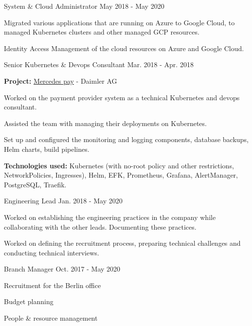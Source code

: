 \begin{cventries}
    \cventry
    {System \& Cloud Administrator}
    {}
    {}
    {May 2018 - May 2020}
    {
    \begin{cvitems}
        \item {
        Migrated various applications that are running on Azure to Google Cloud,
        to managed Kubernetes clusters and other managed GCP resources.
        }
        \item {Identity Access Management of the cloud resources on Azure and Google Cloud.}
    \end{cvitems}
    }

    \cventry
    {Senior Kubernetes \& Devops Consultant}
    {}
    {}
    {Mar. 2018 - Apr. 2018}
    {
    \begin{cvitems}
        \item {
        \textbf{Project:} \href{https://www.daimler-mobility.com/en/solutions/mobility-ecosystem/portfolio/payment-services/}{Mercedes pay} - Daimler AG
        }
        \newline
        \item {Worked on the payment provider system as a technical Kubernetes and devops consultant.}
        \item {Assisted the team with managing their deployments on Kubernetes.}
        \item {
        Set up and configured the monitoring and logging components, database backups,
        Helm charts, build pipelines.
        }
        \smallskip
        \item {
        \textbf{Technologies used:} Kubernetes (with no-root policy and other restrictions,
        NetworkPolicies, Ingresses), Helm, EFK, Prometheus,
        Grafana, AlertManager, PostgreSQL, Traefik.
        }
    \end{cvitems}
    }

    \cventry
    {Engineering Lead}
    {}
    {}
    {Jan. 2018 - May 2020}
    {
    \begin{cvitems}
        \item {
        Worked on establishing the engineering practices in the company while
        collaborating with the other leads. Documenting these practices.
        }
        \item {
        Worked on defining the recruitment process, preparing technical challenges
        and conducting technical interviews.
        }
    \end{cvitems}
    }

    \cventry
    {Branch Manager}
    {}
    {}
    {Oct. 2017 - May 2020}
    {
    \begin{cvitems}
        \item {Recruitment for the Berlin office}
        \item {Budget planning}
        \item {People \& resource management}
    \end{cvitems}
    }


\end{cventries}
